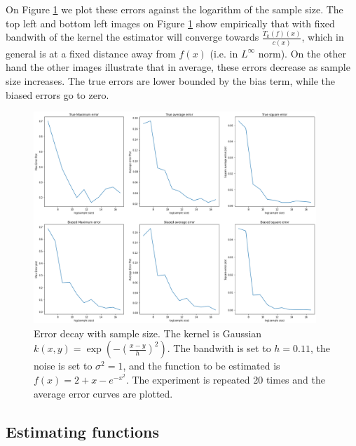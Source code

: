 \documentclass{article}
\begin{document}
On Figure \ref{fig:error_decay} we plot these errors against the logarithm of the sample size. The top left
and bottom left 
images 
on Figure \ref{fig:error_decay} show empirically that with fixed bandwith  of the kernel the estimator will converge towards $\frac{T_k(f)(x)}{c(x)}$, which in general is at a fixed distance away from $f(x)$ (i.e. in $L^{\infty}$ norm). On the other hand the other images illustrate that in average, these errors decrease as sample size increases. The true errors are lower bounded by the bias term, while the biased errors go to zero.
\begin{figure}
    \centering
    \includegraphics[width=0.95\textwidth]{gaussian_f_3_20_sim_better_bias_estimate.png}
    \caption{Error decay with sample size. The kernel is Gaussian $k(x,y)=\exp(-(\frac{x-y}{h})^2)$. The bandwith is set to $h=0.11$, the noise is set to $\sigma^2=1$, and the function to be estimated is $f(x)=2+x-e^{-x^2}$.
    The experiment is repeated 20 times and the average error curves are plotted.
    }
    \label{fig:error_decay}
\end{figure}


\subsection{ Estimating functions }
\end{document}

